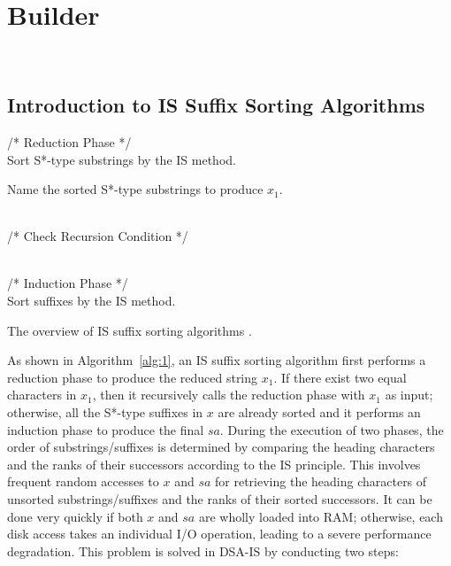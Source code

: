 \documentclass[10pt,journal,compsoc]{IEEEtran}
\begin{document}
\section{Builder}~\label{sec:builder}

\subsection{Introduction to IS Suffix Sorting Algorithms} \label{subsec:improvement}

\begin{algorithm}
	\SetAlgoNoLine
	
	/* Reduction Phase */ \\
	Sort S*-type substrings by the IS method.
	
	Name the sorted S*-type substrings to produce $x_1$.
	
	~\\
	
	/* Check Recursion Condition */ \\	
	
	~\\
	
	/* Induction Phase */ \\
	Sort suffixes by the IS method.
	
	
	\caption{The overview of IS suffix sorting algorithms	.}
	
	\label{alg:1}
\end{algorithm}

As shown in Algorithm~\ref{alg:1}, an IS suffix sorting algorithm first performs a reduction phase to produce the reduced string $x_1$. If there exist two equal characters in $x_1$, then it recursively calls the reduction phase with $x_1$ as input; otherwise, all the S*-type suffixes in $x$ are already sorted and it performs an induction phase to produce the final $sa$. During the execution of two phases, the order of substrings/suffixes is determined by comparing the heading characters and the ranks of their successors according to the IS principle. This involves frequent random accesses to $x$ and $sa$ for retrieving the heading characters of unsorted substrings/suffixes and the ranks of their sorted successors. It can be done very quickly if both $x$ and $sa$ are wholly loaded into RAM; otherwise, each disk access takes an individual I/O operation, leading to a severe performance degradation. This problem is solved in DSA-IS by conducting two steps:
\end{document}
